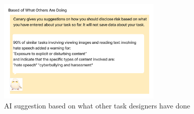 \begin{figure}
    \centering
    \includegraphics[width=0.7\textwidth]{figures/study-probes/AI-probes/AI-task-designers.pdf}
    \caption{AI suggestion based on what other task designers have done\protect\footnotemark}
    \label{fig:AI-based-on-others}
\end{figure}

